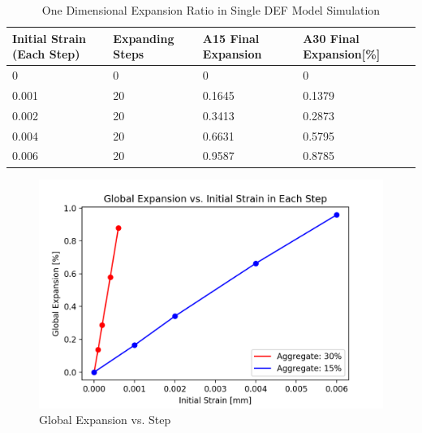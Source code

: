 \begin{table}[ht!]
\centering
\begin{tabular}{ ||p{2cm}|p{2cm}|p{2cm}|p{2cm}|| }
 \hline
    Initial Strain (Each Step) & Expanding Steps & A15 Final Expansion & A30 Final Expansion[\%] \\ [0.5ex]
 \hline\hline
  0 & 0 & 0 & 0 \\
  0.001 & 20 & 0.1645 & 0.1379\\
  0.002 & 20 & 0.3413 & 0.2873\\
  0.004 & 20 & 0.6631 & 0.5795\\
  0.006 & 20 & 0.9587 & 0.8785\\
 \hline
\end{tabular}
\caption{One Dimensional Expansion Ratio in Single DEF Model Simulation}
\label{table:DEF_15vs30_EXP}
\end{table}

\begin{figure}[ht!]
\centering
\includegraphics[width=.8\linewidth]{Files/exp_plot/DEFA30vsA15_exp.png}
  \caption{Global Expansion vs. Step}
  \label{fig:DEFA30vsA15_exp}
\end{figure}

